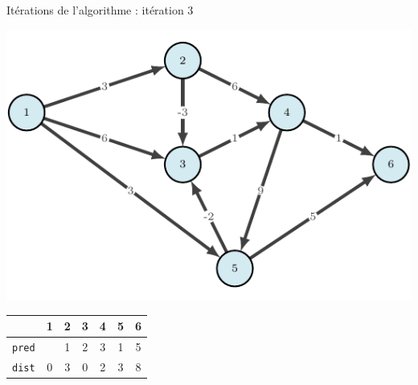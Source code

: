 \begin{frame}{Itérations de l'algorithme : itération 3}
    \begin{center}
        \includegraphics[height=.6\textheight]{fig/bellmann-0.pdf}      
    \begin{tabular}{c|cccccc}
      
        & 1    &2      &3      &4      &5      &6      \\
        \hline
        \texttt{pred} & &1      &2      &3      &1      &5      \\
        \texttt{dist} & 0       &3      &0      &2      &3      &8      \\
            \end{tabular}
\end{center}
\end{frame}

